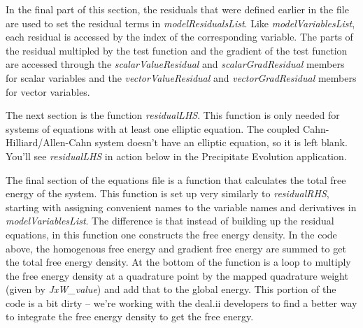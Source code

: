 \documentclass[10pt]{article} %
\begin{document}
In the final part of this section, the residuals that were defined earlier in the file are used to set the residual terms in \emph{modelResidualsList}. Like \emph{modelVariablesList}, each residual is accessed by the index of the corresponding variable. The parts of the residual multipled by the test function and the gradient of the test function are accessed through the \emph{scalarValueResidual} and  \emph{scalarGradResidual} members for scalar variables and the \emph{vectorValueResidual} and  \emph{vectorGradResidual} members for vector variables.

The next section is the function \emph{residualLHS}. This function is only needed for systems of equations with at least one elliptic equation. The coupled Cahn-Hilliard/Allen-Cahn system doesn't have an elliptic equation, so it is left blank. You'll see \emph{residualLHS} in action below in the Precipitate Evolution application.

The final section of the equations file is a function that calculates the total free energy of the system. This function is set up very similarly to \emph{residualRHS}, starting with assigning convenient names to the variable names and derivatives in \emph{modelVariablesList}. The difference is that instead of building up the residual equations, in this function one constructs the free energy density. In the code above, the homogenous free energy and gradient free energy are summed to get the total free energy density. At the bottom of the function is a loop to multiply the free energy density at a quadrature point by the mapped quadrature weight (given by \emph{JxW\_value}) and add that to the global energy. This portion of the code is a bit dirty -- we're working with the deal.ii developers to find a better way to integrate the free energy density to get the free energy.
\end{document}
